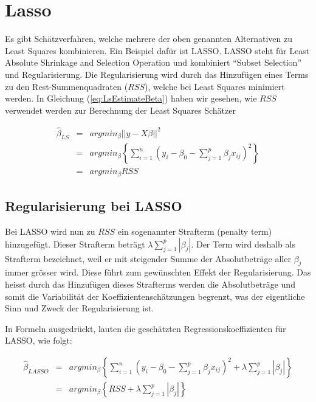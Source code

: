 \documentclass[]{book}
\begin{document}
\section{Lasso}\label{sec-lasso}

Es gibt Schätzverfahren, welche mehrere der oben genannten Alternativen
zu Least Squares kombinieren. Ein Beispiel dafür ist LASSO. LASSO steht
für Least Absolute Shrinkage and Selection Operation und kombiniert
``Subset Selection'' und Regularisierung. Die Regularisierung wird durch
das Hinzufügen eines Terms zu den Rest-Summenquadraten (\(RSS\)), welche
bei Least Squares minimiert werden. In Gleichung
(\ref{eq:LsEstimateBeta}) haben wir gesehen, wie \(RSS\) verwendet
werden zur Berechnung der Least Squares Schätzer

\begin{eqnarray}
\hat{\beta}_{LS} & = & argmin_{\beta}||y - X\beta||^2 \nonumber \\
                     & = & argmin_{\beta} \left\{\sum_{i = 1}^n\left(y_i - \beta_0 - \sum_{j=1}^p \beta_j x_{ij} \right)^2\right\} \nonumber \\
                     & = & argmin_{\beta} RSS
\label{eq:LsEstimateBetaExpandRSS}
\end{eqnarray}

\subsection{Regularisierung bei LASSO}\label{regularisierung-bei-lasso}

Bei LASSO wird nun zu \(RSS\) ein sogenannter Strafterm (penalty term)
hinzugefügt. Dieser Strafterm beträgt \(\lambda\sum_{j=1}^p|\beta_j|\).
Der Term wird deshalb als Strafterm bezeichnet, weil er mit steigender
Summe der Absolutbeträge aller \(\beta_j\) immer grösser wird. Diese
führt zum gewünschten Effekt der Regularisierung. Das heisst durch das
Hinzufügen dieses Strafterms werden die Absolutbeträge und somit die
Variabilität der Koeffizientenschätzungen begrenzt, was der eigentliche
Sinn und Zweck der Regularisierung ist.

In Formeln ausgedrückt, lauten die geschätzten Regressionskoeffizienten
für LASSO, wie folgt:

\begin{eqnarray}
\hat{\beta}_{LASSO} & = & argmin_{\beta} \left\{\sum_{i=1}^n\left(y_i - \beta_0 - \sum_{j=1}^p \beta_j x_{ij} \right)^2 + \lambda\sum_{j=1}^p|\beta_j| \right\} \nonumber \\
                     & = & argmin_{\beta} \left\{RSS + \lambda\sum_{j=1}^p|\beta_j|\right\}
\label{eq:LsEstimateBetaLASSO}
\end{eqnarray}
\end{document}
